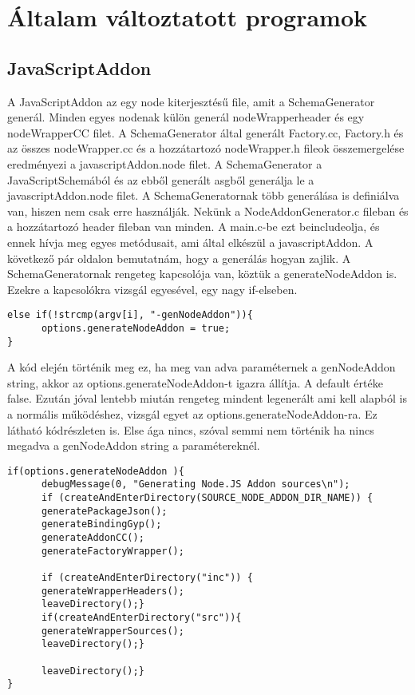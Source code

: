 \chapter{Általam változtatott programok}\label{chap:altalam_valtoztatott_programok}

\section{JavaScriptAddon}

A JavaScriptAddon az egy node kiterjesztésű file, amit a SchemaGenerator generál. Minden egyes nodenak külön generál nodeWrapperheader és egy nodeWrapperCC filet.
A SchemaGenerator által generált Factory.cc, Factory.h és az összes nodeWrapper.cc és a hozzátartozó nodeWrapper.h fileok összemergelése eredményezi a javascriptAddon.node filet.
A SchemaGenerator a JavaScriptSchemából és az ebből generált asgből generálja le a javascriptAddon.node filet.
A SchemaGeneratornak több generálása is definiálva van, hiszen nem csak erre használják. Nekünk a NodeAddonGenerator.c fileban és a hozzátartozó header fileban van minden.
A main.c-be ezt beincludeolja, és ennek hívja meg egyes metódusait, ami által elkészül a javascriptAddon.
A következő pár oldalon bemutatnám, hogy a generálás hogyan zajlik.
A SchemaGeneratornak rengeteg kapcsolója van, köztük a generateNodeAddon is. Ezekre a kapcsolókra vizsgál egyesével, egy nagy if-elseben.
\begin{lstlisting}[caption={SchemaGenerator kapcsoló vizsgálás},label={lst:schemagenerator_argv_genNodeAddon}, language={CStyle}]
else if(!strcmp(argv[i], "-genNodeAddon")){
      options.generateNodeAddon = true;
}
\end{lstlisting}
A kód elején történik meg ez, ha meg van adva paraméternek a genNodeAddon string, akkor az options.generateNodeAddon-t igazra állítja. A default értéke false.
Ezután jóval lentebb miután rengeteg mindent legenerált ami kell alapból is a normális működéshez, vizsgál egyet az options.generateNodeAddon-ra.
Ez látható  kódrészleten is. Else ága nincs, szóval semmi nem történik ha nincs megadva a genNodeAddon string a paramétereknél.
\begin{lstlisting}[caption={SchemaGenerator javascriptAddon generálás},label={lst:schemagenerator_genNodeAddon_check}, language={CStyle}]
if(options.generateNodeAddon ){
      debugMessage(0, "Generating Node.JS Addon sources\n");
      if (createAndEnterDirectory(SOURCE_NODE_ADDON_DIR_NAME)) {
      generatePackageJson();
      generateBindingGyp();
      generateAddonCC();
      generateFactoryWrapper();

      if (createAndEnterDirectory("inc")) {
      generateWrapperHeaders();
      leaveDirectory();}
      if(createAndEnterDirectory("src")){
      generateWrapperSources();
      leaveDirectory();}

      leaveDirectory();}
}
\end{lstlisting}

